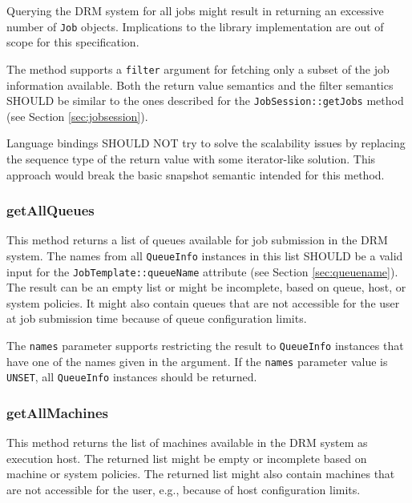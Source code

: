 \documentclass{article}
\newcommand{\h}[1]{\lstinline|#1|}
\newcommand{\langbind}[1]{\begin{shaded}#1\end{shaded}}
\newcommand{\rat}[1]{}
\begin{document}
Querying the DRM system for all jobs might result in returning an excessive number of \h{Job} objects. Implications to the library implementation are out of scope for this specification. 

The method supports a \h{filter} argument for fetching only a subset of the job information available. Both the return value semantics and the filter semantics SHOULD be similar to the ones described for the \h{JobSession::getJobs} method (see Section \ref{sec:jobsession}). 

\langbind{
Language bindings SHOULD NOT try to solve the scalability issues by replacing the sequence type of the return value with some iterator-like solution. This approach would break the basic snapshot semantic intended for this method.
}

\rat{
The non-argumentation about the scalability problem was the final result of a clarification attempt. We hand this one over to the implementors. (conf call Jul 14th 2010)
}

\subsubsection{getAllQueues}

This method returns a list of queues available for job submission in the DRM system. The names from all \h{QueueInfo} instances in this list SHOULD be a valid input for the \h{JobTemplate::queueName} attribute (see Section \ref{sec:queuename}). The result can be an empty list or might be incomplete, based on queue, host, or system policies. It might also contain queues that are not accessible for the user at job submission time because of queue configuration limits.

The \h{names} parameter supports restricting the result to \h{QueueInfo} instances that have one of the names given in the argument. If the \h{names} parameter value is \h{UNSET}, all \h{QueueInfo} instances should be returned.

\subsubsection{getAllMachines}

This method returns the list of machines available in the DRM system as execution host. The returned list might be empty or incomplete based on machine or system policies. The returned list might also contain machines that are not accessible for the user, e.g., because of host configuration limits.
\end{document}
